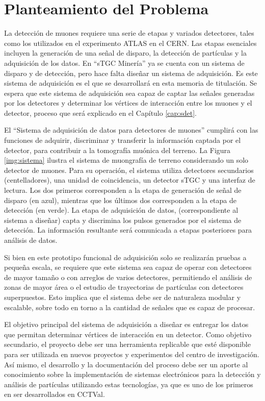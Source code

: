 \section{Planteamiento del Problema}
\label{sec:planteamiento}
	La detección de muones requiere una serie de etapas y variados detectores,  tales como los utilizados en el experimento ATLAS en el CERN. Las etapas esenciales incluyen la generación de una señal de disparo\cite{Oyanadel2020SistemaSTGC}, la detección de partículas y la adquisición de los datos. En ``sTGC Minería'' ya se cuenta con un sistema de disparo y de detección, pero hace falta diseñar un sistema de adquisición. Es este sistema de adquisición es el que se desarrollará en esta memoria de titulación. Se espera que este sistema de adquisición sea capaz de captar las señales generadas por los detectores y determinar los vértices de interacción entre los muones y el detector, proceso que será explicado en el Capítulo \ref{cap:sdet}. 
	
	El ``Sistema de adquisición de datos para detectores de muones'' cumplirá con las funciones de adquirir, discriminar y transferir la información captada por el detector, para contribuir a la tomografía muónica del terreno. La Figura \ref{img:sistema} ilustra el sistema de muongrafía de terreno considerando un solo detector de muones. Para su operación, el sistema utiliza detectores secundarios (centelladores), una unidad de coincidencia, un detector sTGC y una interfaz de lectura. Los dos primeros corresponden a la etapa de generación de señal de disparo (en azul), mientras que los últimos dos corresponden a la etapa de detección (en verde). La etapa de adquisición de datos, (correspondiente al sistema  a diseñar) capta y discrimina los pulsos generados por el sistema de detección. La información resultante será comunicada a etapas posteriores para análisis de datos.
	
	Si bien en este prototipo funcional de adquisición solo se realizarán pruebas a pequeña escala, se requiere que este sistema sea capaz de operar con detectores de mayor tamaño o con arreglos de varios detectores, permitiendo el análisis de zonas de mayor área o el estudio de trayectorias de partículas con detectores superpuestos. Esto implica que el sistema debe ser de naturaleza modular y escalable, sobre todo en torno a la cantidad de señales que es capaz de procesar. 
	
	El objetivo principal del sistema de adquisición a diseñar es entregar los datos que permitan determinar vértices de interacción en un detector. Como objetivo secundario, el proyecto debe ser una herramienta replicable que esté disponible para ser utilizada en nuevos proyectos y experimentos del centro de investigación. Así mismo, el desarrollo y la documentación del proceso debe ser un aporte al conocimiento sobre la implementación de sistemas electrónicos para la detección y análisis de partículas utilizando estas tecnologías, ya que es uno de los primeros en ser desarrollados en CCTVal. 
	
